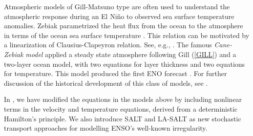 \documentclass[11pt, oneside]{article}   	%
\numberwithin{equation}{section}
\theoremstyle{plain}
\theoremstyle{definition}
\theoremstyle{remark}
\newcommand{\<}{\langle}
\renewcommand{\>}{\rangle}
\begin{document}
Atmospheric models of Gill-Matsuno type are often used to understand the atmospheric response during an El Ni\~{n}o to observed 
sea surface temperature anomalies. Zebiak \cite{zebiak1982simple} parametrized the heat flux from the ocean to the atmosphere in terms of the ocean sea surface temperature . This relation can be motivated by a linearization of Clausius-Clapeyron relation. See, e.g., \cite{zebiak1986atmospheric}. 
The famous {\it Cane-Zebiak model} \cite{cane1985theory} applied a steady state atmosphere following Gill (\ref{GILL}) and a two-layer ocean model, with two equations for layer thickness and two equations for temperature. This model produced the first ENO forecast \cite{zebiak1987model}.
For further discussion of the historical development of this class of models, see \cite{crisan2023implementation}.

In \cite{crisan2023implementation}, we have modified the equations in the models above by including nonlinear terms 
in the velocity and temperature equations, derived from a deterministic Hamilton's principle. 
We also introduce SALT and LA-SALT as new stochastic transport approaches for modelling ENSO's  well-known irregularity. 


  
\end{document}
